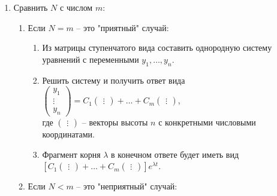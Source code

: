 \documentclass[10pt, a4paper]{article}
\begin{document}
\begin{enumerate}[I.]
\begin{enumerate}
            \item Сравнить $N$ с числом $m$:
                \begin{enumerate}
                    \item Если $N = m$ -- это "приятный" случай:
                        \begin{enumerate}
                            \item Из матрицы ступенчатого вида составить однородную систему уравнений с переменными $y_1, \dots, y_n$.
                            \item Решить систему и получить ответ вида
                            $
                                \begin{pmatrix} y_1 \\ \vdots \\ y_n \end{pmatrix} =
                                C_1\begin{pmatrix} \vdots \end{pmatrix}
                                + \dots
                                + C_m\begin{pmatrix} \vdots \end{pmatrix}
                            $, \\
                            где $\begin{pmatrix} \vdots \end{pmatrix}$ -- векторы высоты $n$ с конкретными числовыми координатами.
                            \item Фрагмент корня $\lambda$ в конечном ответе будет иметь вид
                            $
                                [C_1\begin{pmatrix} \vdots \end{pmatrix}
                                + \dots
                                + C_m\begin{pmatrix} \vdots \end{pmatrix}]e^{\lambda t}
                            $.
                        \end{enumerate}
                    \item Если $N < m$ -- это "неприятный" случай:
\end{enumerate}
\end{enumerate}
\end{enumerate}
\end{document}
